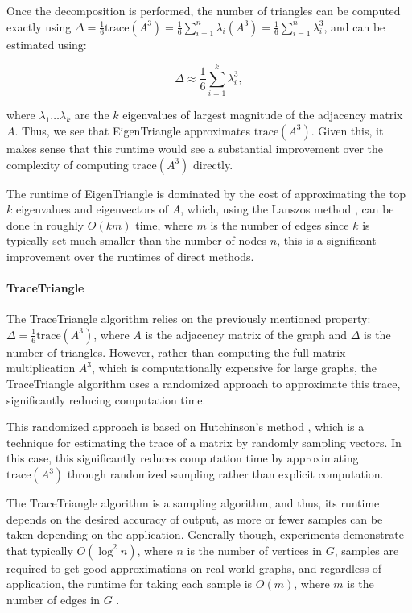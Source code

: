 \documentclass[11pt, margin=1in]{article}
\begin{document}
Once the decomposition is performed, the number of triangles can be computed exactly using $\Delta = \frac{1}{6} \mathrm{trace}(A^3) = \frac{1}{6} \sum_{i = 1}^{n} \lambda_i(A^3) = \frac{1}{6} \sum_{i = 1}^{n} \lambda_i^3$, and can be estimated using:

\[
\Delta \approx \frac{1}{6} \sum_{i=1}^{k} \lambda_i^3,
\]

where $\lambda_1 \ldots \lambda_k$ are the $k$ eigenvalues of largest magnitude of the adjacency matrix $A$.
Thus, we see that EigenTriangle approximates $\mathrm{trace}(A^3)$.
Given this, it makes sense that this runtime would see a substantial improvement over the complexity of computing $\mathrm{trace}(A^3)$ directly.

The runtime of EigenTriangle is dominated by the cost of approximating the top $k$ eigenvalues and eigenvectors of $A$, which, using the Lanszos method \cite{cullum_lanczos_2002}, can be done in roughly $O(k m)$ time, where $m$ is the number of edges since $k$ is typically set much smaller than the number of nodes $n$, this is a significant improvement over the runtimes of direct methods.

\paragraph{TraceTriangle}

The TraceTriangle algorithm \cite{avron_counting_2010} relies on the previously mentioned property: $\Delta = \frac{1}{6} \mathrm{trace}(A^3)$, where $A$ is the adjacency matrix of the graph and $\Delta$ is the number of triangles.
However, rather than computing the full matrix multiplication $A^3$, which is computationally expensive for large graphs, the TraceTriangle algorithm uses a randomized approach to approximate this trace, significantly reducing computation time.

This randomized approach is based on Hutchinson's method \cite{hutchinson_stochastic_1990}, which is a technique for estimating the trace of a matrix by randomly sampling vectors.
In this case, this significantly reduces computation time by approximating $\mathrm{trace}(A^3)$ through randomized sampling rather than explicit computation.

The TraceTriangle algorithm is a sampling algorithm, and thus, its runtime depends on the desired accuracy of output, as more or fewer samples can be taken depending on the application.
Generally though, experiments demonstrate that typically $O(\log^2{n})$, where $n$ is the number of vertices in $G$, samples are required to get good approximations on real-world graphs, and regardless of application, the runtime for taking each sample is $O(m)$, where $m$ is the number of edges in $G$ \cite{avron_counting_2010}.
\end{document}
